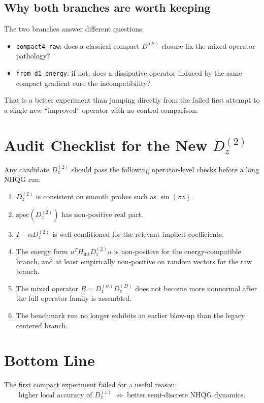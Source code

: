 \documentclass[11pt]{article}
\newcommand{\Dzone}{D^{(1)}_z}
\newcommand{\Dztwo}{D^{(2)}_z}
\newcommand{\Hmat}{H}
\begin{document}
\subsection{Why both branches are worth keeping}

The two branches answer different questions:
\begin{itemize}[nosep]
\item \texttt{compact4\_raw}: does a classical compact-$D^{(2)}$ closure fix the
  mixed-operator pathology?
\item \texttt{from\_d1\_energy}: if not, does a dissipative operator induced by
  the same compact gradient cure the incompatibility?
\end{itemize}

That is a better experiment than jumping directly from the failed first attempt
to a single new ``improved'' operator with no control comparison.

\section{Audit Checklist for the New $D^{(2)}_z$}

Any candidate $\Dztwo$ should pass the following operator-level checks before a
long NHQG run:
\begin{enumerate}[nosep]
\item $\Dztwo$ is consistent on smooth probes such as $\sin(\pi z)$.
\item $\mathrm{spec}(\Dztwo)$ has non-positive real part.
\item $I - \alpha \Dztwo$ is well-conditioned for the relevant implicit
  coefficients.
\item The energy form $u^T \Hmat_{\mathrm{int}} \Dztwo u$ is non-positive for the
  energy-compatible branch, and at least empirically non-positive on random
  vectors for the raw branch.
\item The mixed operator $B = D^{(\psi)}_z D^{(D)}_z$ does not become more
  nonnormal after the full operator family is assembled.
\item The benchmark run no longer exhibits an earlier blow-up than the legacy
  centered branch.
\end{enumerate}

\section{Bottom Line}

The first compact experiment failed for a useful reason:
\begin{equation}
\boxed{
\text{higher local accuracy of } \Dzone
\;\not\Rightarrow\;
\text{better semi-discrete NHQG dynamics.}
}
\end{equation}
\end{document}
